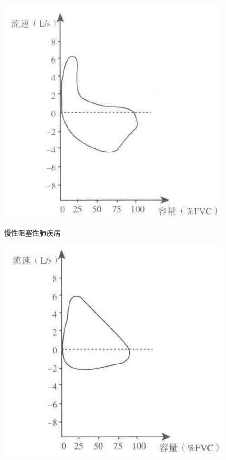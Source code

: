 \documentclass[10pt]{article}
\begin{document}
\begin{center}
\includegraphics[max width=\textwidth]{2024_07_05_645bb794a4d4f32ee0c8g-101(3)}
\end{center}

慢性阻塞性肺疾病

\begin{center}
\includegraphics[max width=\textwidth]{2024_07_05_645bb794a4d4f32ee0c8g-101}
\end{center}
\end{document}
